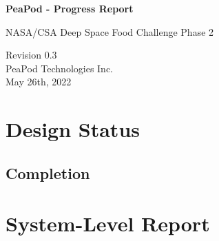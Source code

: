 \documentclass{../tex/report}
\begin{document}
\begin{titlepage}
    \begin{center}
        \vspace*{1.2cm}

        \textbf{\large{PeaPod - Progress Report}}

        \vspace{0.5cm}

        NASA/CSA Deep Space Food Challenge Phase 2

        \vfill
        
        \vspace{.75cm}

        Revision 0.3\\
        PeaPod Technologies Inc.\\
        May 26th, 2022

    \end{center}
\end{titlepage}

\thispagestyle{plain}

\tableofcontents
\clearpage

\section{Design Status}

\subsection{Completion}



\clearpage

\section{System-Level Report}



\clearpage



\clearpage



\clearpage


\end{document}
